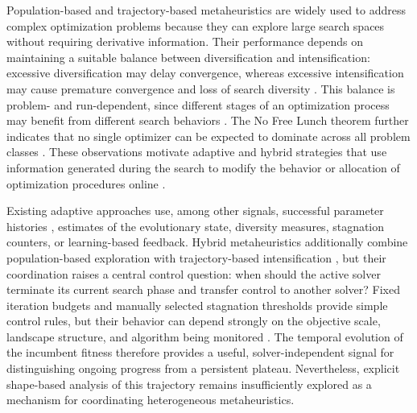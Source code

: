 \documentclass[review]{elsarticle}
\begin{document}
Population-based and trajectory-based metaheuristics are widely used to address complex optimization problems because they can explore large search spaces without requiring derivative information. Their performance depends on maintaining a suitable balance between diversification and intensification: excessive diversification may delay convergence, whereas excessive intensification may cause premature convergence and loss of search diversity \cite{akbulut2026artificial}. This balance is problem- and run-dependent, since different stages of an optimization process may benefit from different search behaviors \cite{vega2021learning}. The No Free Lunch theorem further indicates that no single optimizer can be expected to dominate across all problem classes \cite{wolpert1997no}. These observations motivate adaptive and hybrid strategies that use information generated during the search to modify the behavior or allocation of optimization procedures online \cite{talbi2002taxonomy,pei2024learning}.

Existing adaptive approaches use, among other signals, successful parameter histories \cite{song2019review}, estimates of the evolutionary state, diversity measures, stagnation counters, or learning-based feedback. Hybrid metaheuristics additionally combine population-based exploration with trajectory-based intensification \cite{talbi2016combining,karimimamaghan2022machine}, but their coordination raises a central control question: when should the active solver terminate its current search phase and transfer control to another solver? \cite{talbi2021machine_tax} Fixed iteration budgets and manually selected stagnation thresholds provide simple control rules, but their behavior can depend strongly on the objective scale, landscape structure, and algorithm being monitored \cite{elhashash2025hybrid,pei2024learning}. The temporal evolution of the incumbent fitness therefore provides a useful, solver-independent signal for distinguishing ongoing progress from a persistent plateau. Nevertheless, explicit shape-based analysis of this trajectory remains insufficiently explored as a mechanism for coordinating heterogeneous metaheuristics.
\end{document}
